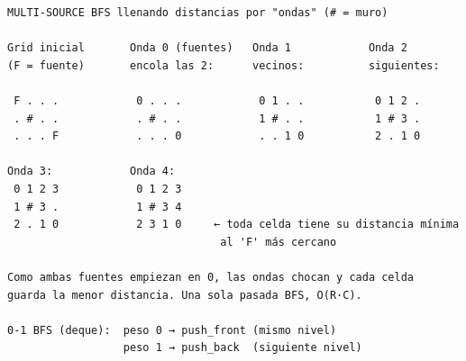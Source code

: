 \begin{dsacomofunciona}
\begin{verbatim}
MULTI-SOURCE BFS llenando distancias por "ondas" (# = muro)

Grid inicial       Onda 0 (fuentes)   Onda 1            Onda 2
(F = fuente)       encola las 2:      vecinos:          siguientes:

 F . . .            0 . . .            0 1 . .           0 1 2 .
 . # . .            . # . .            1 # . .           1 # 3 .
 . . . F            . . . 0            . . 1 0           2 . 1 0

Onda 3:            Onda 4:
 0 1 2 3            0 1 2 3
 1 # 3 .            1 # 3 4
 2 . 1 0            2 3 1 0     ← toda celda tiene su distancia mínima
                                 al 'F' más cercano

Como ambas fuentes empiezan en 0, las ondas chocan y cada celda
guarda la menor distancia. Una sola pasada BFS, O(R·C).

0-1 BFS (deque):  peso 0 → push_front (mismo nivel)
                  peso 1 → push_back  (siguiente nivel)
\end{verbatim}
\end{dsacomofunciona}

